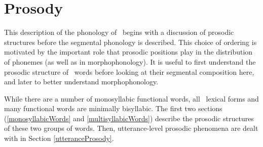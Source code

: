 


\chapter{Prosody}\label{ProsodicStructure}

This description of the phonology of \PS\ begins with a discussion of prosodic structures before the segmental phonology is described. This choice of ordering is motivated by the important role that prosodic positions play in the distribution of phonemes (as well as in morphophonology). It is useful to first understand the prosodic structure of \PS\ words before looking at their segmental composition here, and later to better understand morphophonology. 

While there are a number of monosyllabic functional words, all \PS\ lexical forms and many functional words are minimally bisyllabic. 
The first two sections (\ref{monosyllabicWords} and \ref{multisyllabicWords}) describe the prosodic structures of these two groups of words.  
Then, utterance-level prosodic phenomena are dealt with in Section \ref{utteranceProsody}.

